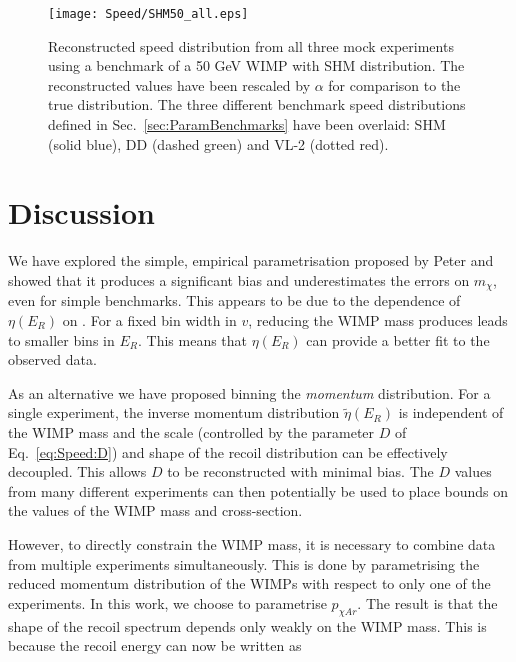  \begin{figure}[t]
\centering
\texttt{[image: Speed/SHM50\_all.eps]}
\caption[Reconstructed speed distribution from all three mock experiments for a 50 GeV WIMP with SHM distribution. All three benchmark distributions are shown for comparison.]{Reconstructed speed distribution from all three mock experiments using a benchmark of a 50 GeV WIMP with SHM distribution. The reconstructed values have been rescaled by \(\alpha\) for comparison to the true distribution. The three different benchmark speed distributions defined in Sec.\ \ref{sec:ParamBenchmarks} have been overlaid: SHM (solid blue), DD (dashed green) and VL-2 (dotted red).}
  \label{fig:Speed:SHM50_all}
\end{figure}



\section{Discussion}

We have explored the simple, empirical parametrisation proposed by Peter and showed that it produces a significant bias and underestimates the errors on $m_\chi$, even for simple benchmarks.  This appears to be due to the dependence of $\eta(E_R)$ on \mchi. For a fixed bin width in $v$, reducing the WIMP mass produces leads to smaller bins in $E_R$. This means that $\eta(E_R)$ can provide a better fit to the observed data.

As an alternative we have proposed binning the \textit{momentum} distribution. For a single experiment, the inverse momentum distribution $\tilde{\eta}(E_R)$ is independent of the WIMP mass and the scale (controlled by the parameter $D$ of Eq.~\ref{eq:Speed:D}) and shape of the recoil distribution can be effectively decoupled. This allows $D$ to be reconstructed with minimal bias. The $D$ values from many different experiments can then potentially be used to place bounds on the values of the WIMP mass and cross-section.

However, to directly constrain the WIMP mass, it is necessary to combine data from multiple experiments simultaneously. This is done by parametrising the reduced momentum distribution of the WIMPs with respect to only one of the experiments. In this work, we choose to parametrise $p_{\chi Ar}$. The result is that the shape of the recoil spectrum depends only weakly on the WIMP mass. This is because the recoil energy can now be written as

